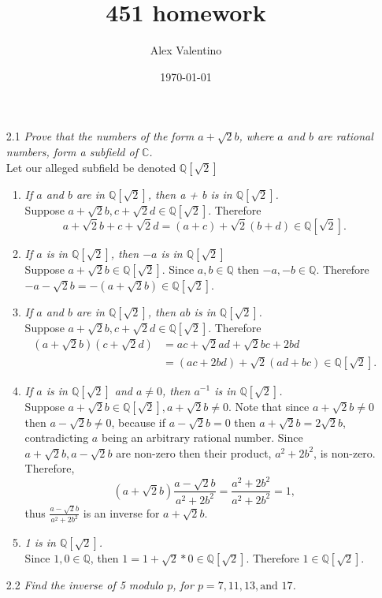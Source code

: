 \documentclass[12pt, letterpaper]{article}
\date{\today}
\author{Alex Valentino}
\title{451 homework}
\newcommand{\C}{\mathbb{C}}
\newcommand{\Q}{\mathbb{Q}}
\begin{document}
\begin{enumerate}
	\item[2.1] \textit{Prove that the numbers of the form $a + \sqrt{2}b$, where $a$ and $b$ are rational numbers, form a 
subfield of $\C$.}\\
	Let our alleged subfield be denoted $\Q[\sqrt{2}]$
	\begin{enumerate}
		\item \textit{If $a$ and $b$ are in $\Q[\sqrt{2}]$, then a + b is in $\Q[\sqrt{2}]$.}\\
		Suppose $a+\sqrt{2}b, c + \sqrt{2}d \in \Q[\sqrt{2}]$.  Therefore
		$$
		a+\sqrt{2}b + c + \sqrt{2}d = (a+c) + \sqrt{2}(b+d) \in  \Q[\sqrt{2}].
		$$
		
		\item \textit{If $a$ is in $\Q[\sqrt{2}]$, then $-a$ is in $\Q[\sqrt{2}]$}\\
		Suppose $a + \sqrt{2}b \in \Q[\sqrt{2}]$.  Since $a,b \in \Q$ then 
		$-a,-b \in \Q$.  Therefore $-a - \sqrt{2}b = -(a+\sqrt{2}b) \in \Q[\sqrt{2}]$.
		\item \textit{If $a$ and $b$ are in  $\Q[\sqrt{2}]$, then $ab$ is in $\Q[\sqrt{2}]$.}\\
		Suppose $a+\sqrt{2}b, c + \sqrt{2}d \in \Q[\sqrt{2}]$.  Therefore
		\begin{align*}
			(a+\sqrt{2}b)(c + \sqrt{2}d) &= ac + \sqrt{2}ad + \sqrt{2}bc + 2bd\\
			&= (ac + 2bd) + \sqrt{2}(ad + bc) \in \Q[\sqrt{2}].
		\end{align*}
		\item \textit{If $a$ is in $\Q[\sqrt{2}]$ and $a\neq0$, then $a^{-1}$ is in $\Q[\sqrt{2}]$.}\\
		Suppose $a + \sqrt{2}b \in \Q[\sqrt{2}], a+ \sqrt{2}b  \neq 0$.  
		Note that since $a+ \sqrt{2}b  \neq 0$ then $a-\sqrt{2}b \neq 0$, because if $a-\sqrt{2}b = 0$ then $a+\sqrt{2}b = 2\sqrt{2}b$, contradicting $a$ being an arbitrary rational number.  Since $a+\sqrt{2}b, a-\sqrt{2}b$ are non-zero then their product, $a^2 + 2b^2$, is non-zero.  Therefore, 
		$$
		(a+\sqrt{2}b)\frac{a-\sqrt{2}b}{a^2+2b^2} = \frac{a^2+2b^2}{a^2+2b^2} = 1,
		$$
		thus $\frac{a-\sqrt{2}b}{a^2+2b^2}$ is an inverse for $a+\sqrt{2}b$.	
		\item \textit{1 is in $\Q[\sqrt{2}]$.}\\
		Since $1,0 \in \Q$, then $1 = 1 + \sqrt{2}*0 \in \Q[\sqrt{2}]$.
		Therefore $1 \in \Q[\sqrt{2}]$.
	\end{enumerate}
	\iffalse	
	\item[2.2]\textit{Find the inverse of 5 modulo $p$, for $p = 7, 11, 13, \text{and } 17$.}

\end{enumerate}
\end{document}
